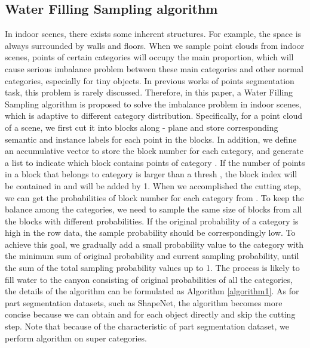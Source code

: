 \documentclass{cta-author}
\begin{document}
\subsection{Water Filling Sampling algorithm}
\label{subsec:wfs}
In indoor scenes, there exists some inherent structures. For example, the space is always surrounded by walls and floors. When we sample point clouds from indoor scenes, points of certain categories will occupy the main proportion, which will cause serious imbalance problem between these main categories and other normal categories, especially for tiny objects. In previous works of points segmentation task, this problem is rarely discussed. Therefore, in this paper, a Water Filling Sampling algorithm is proposed to solve the imbalance problem in indoor scenes, which is adaptive to different category distribution. Specifically, for a point cloud of a scene, we first cut it into blocks along - plane and store corresponding semantic and instance labels for each point in the blocks. In addition, we define an accumulative vector  to store the block number for each category, and generate a list  to indicate which block contains points of category . If the number of points in a block that belongs to category  is larger than a thresh , the block index will be contained in  and  will be added by 1. When we accomplished the cutting step, we can get the probabilities of block number for each category from . 
To keep the balance among the categories, we need to sample the same size of blocks from all the blocks with different probabilities. If the original probability of a category is high in the row data, the sample probability should be correspondingly low. To achieve this goal, we gradually add a small probability value  to the category with the minimum sum of original probability and current sampling probability, until the sum of the total sampling probability values up to 1. The process is likely to fill water to the canyon consisting of original probabilities of all the categories, the details of the algorithm can be formulated as Algorithm \ref{algorithm1}. As for part segmentation datasets, such as ShapeNet, the algorithm becomes more concise because we can obtain  and  for each object directly and skip the cutting step. Note that because of the characteristic of part segmentation dataset, we perform  algorithm on super categories.
\end{document}
